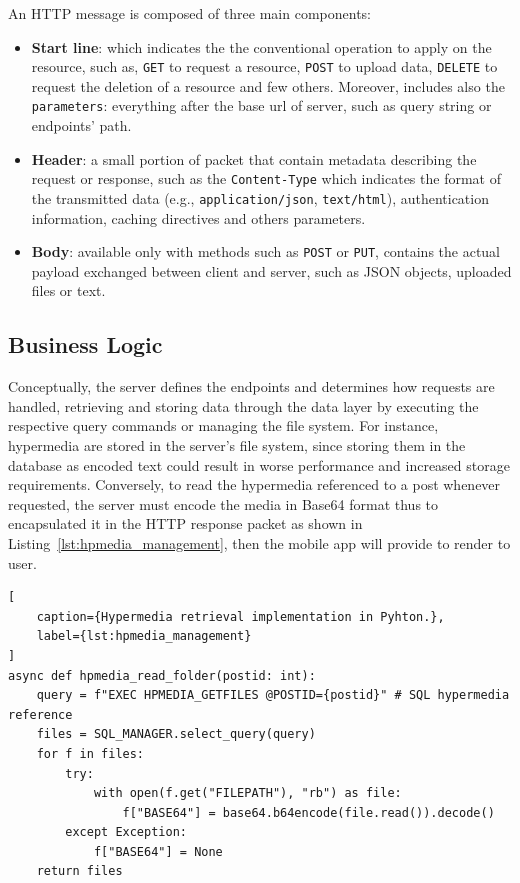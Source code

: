 An HTTP message is composed of three main components:
\begin{itemize}
    \item \textbf{Start line}: which indicates the the conventional operation to apply on the resource, such as, \texttt{GET} to request a resource, \texttt{POST} to upload data, \texttt{DELETE} to request the deletion of a resource and few others. Moreover, includes also the \texttt{parameters}: everything after the base url of server, such as query string or endpoints' path.
    
    \item \textbf{Header}: a small portion of packet that contain metadata describing the request or response, such as the \texttt{Content-Type} which indicates the format of the transmitted data (e.g., \texttt{application/json}, \texttt{text/html}), authentication information, caching directives and others parameters.
    \item \textbf{Body}: available only with methods such as \texttt{POST} or \texttt{PUT}, contains the actual payload exchanged between client and server, such as JSON objects, uploaded files or text.
\end{itemize}

\subsection{Business Logic}

Conceptually, the server defines the endpoints and determines how requests are handled, retrieving and storing data through the data layer by executing the respective query commands or managing the file system. For instance, hypermedia are stored in the server's file system, since storing them in the database as encoded text could result in worse performance and increased storage requirements. Conversely, to read the hypermedia referenced to a post whenever requested, the server must encode the media in Base64 format thus to encapsulated it in the HTTP response packet as shown in Listing~\ref{lst:hpmedia_management}, then the mobile app will provide to render to user.

\newpage


\begin{lstlisting}[
    caption={Hypermedia retrieval implementation in Pyhton.},
    label={lst:hpmedia_management}
]
async def hpmedia_read_folder(postid: int):
    query = f"EXEC HPMEDIA_GETFILES @POSTID={postid}" # SQL hypermedia reference
    files = SQL_MANAGER.select_query(query)
    for f in files:
        try:
            with open(f.get("FILEPATH"), "rb") as file:
                f["BASE64"] = base64.b64encode(file.read()).decode()
        except Exception:
            f["BASE64"] = None
    return files
\end{lstlisting}

